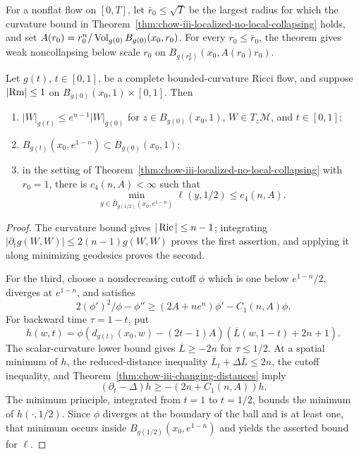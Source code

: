 \begin{remark}
\label{rem:chow-iii-localized-noncollapsing-maximal-scale}
For a nonflat flow on \([0,T]\), let \(\bar r_0\le\sqrt T\) be the largest
radius for which the curvature bound in
Theorem~\ref{thm:chow-iii-localized-no-local-collapsing} holds, and set
\(A(r_0)=r_0^n/\operatorname{Vol}_{g(0)}B_{g(0)}(x_0,r_0)\).  For every
\(r_0\le\bar r_0\), the theorem gives weak noncollapsing below scale \(r_0\)
on \(B_{g(r_0^2)}(x_0,A(r_0)r_0)\).
\end{remark}

\begin{lemma}
\label{lem:chow-iii-localized-reduced-distance-control}
Let \(g(t)\), \(t\in[0,1]\), be a complete bounded-curvature Ricci flow, and
suppose
\(\lvert\operatorname{Rm}\rvert\le1\) on \(B_{g(0)}(x_0,1)\times[0,1]\).  Then
\begin{enumerate}
\item \(|W|_{g(t)}\le e^{n-1}|W|_{g(0)}\) for
\(z\in B_{g(0)}(x_0,1)\), \(W\in T_z\mathcal M\), and \(t\in[0,1]\);
\item \(B_{g(t)}(x_0,e^{1-n})\subset B_{g(0)}(x_0,1)\);
\item in the setting of Theorem~\ref{thm:chow-iii-localized-no-local-collapsing}
with \(r_0=1\), there is \(c_4(n,A)<\infty\) such that
\[
 \min_{y\in\overline B_{g(1/2)}(x_0,e^{1-n})}\ell(y,1/2)\le c_4(n,A).
\]
\end{enumerate}
\end{lemma}
\begin{proof}
The curvature bound gives \(|\operatorname{Ric}|\le n-1\); integrating
\(|\partial_tg(W,W)|\le2(n-1)g(W,W)\) proves the first assertion, and applying
it along minimizing geodesics proves the second.

For the third, choose a nondecreasing cutoff \(\phi\) which is one below
\(e^{1-n}/2\), diverges at \(e^{1-n}\), and satisfies
\[
 2(\phi')^2/\phi-\phi''\ge(2A+ne^n)\phi'-C_1(n,A)\phi.
\]
For backward time \(\tau=1-t\), put
\[
 h(w,t)=\phi(d_{g(t)}(x_0,w)-(2t-1)A)(\overline L(w,1-t)+2n+1).
\]
The scalar-curvature lower bound gives \(\overline L\ge-2n\) for
\(\tau\le1/2\).  At a spatial minimum of \(h\), the reduced-distance
inequality \(\overline L_t+\Delta\overline L\le2n\), the cutoff inequality,
and Theorem~\ref{thm:chow-iii-changing-distances} imply
\[
 (\partial_t-\Delta)h\ge-(2n+C_1(n,A))h.
\]
The minimum principle, integrated from \(t=1\) to \(t=1/2\), bounds the
minimum of \(h(\cdot,1/2)\).  Since \(\phi\) diverges at the boundary of the
ball and is at least one, that minimum occurs inside
\(B_{g(1/2)}(x_0,e^{1-n})\) and yields the asserted bound for \(\ell\).
\end{proof}

